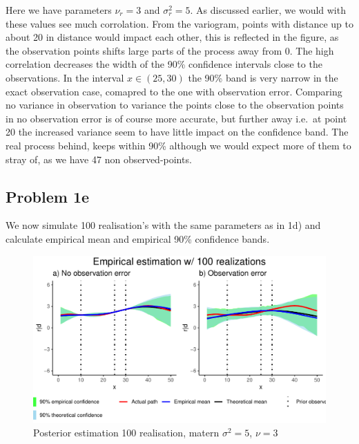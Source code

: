 \documentclass[]{article}
\begin{document}
Here we have parameters \(\nu_r = 3\) and \(\sigma_r^2 = 5\). As
discussed earlier, we would with these values see much corrolation. From
the variogram, points with distance up to about 20 in distance would
impact each other, this is reflected in the figure, as the observation
points shifts large parts of the process away from 0. The high
correlation decreases the width of the 90\% confidence intervals close
to the observations. In the interval \(x\in (25,30)\) the 90\% band is
very narrow in the exact observation case, comapred to the one with
observation error. Comparing no variance in observation to variance the
points close to the observation points in no observation error is of
course more accurate, but further away i.e.~at point 20 the increased
variance seem to have little impact on the confidence band. The real
process behind, keeps within 90\% although we would expect more of them
to stray of, as we have 47 non observed-points.

\subsection{Problem 1e}\label{problem-1e}

We now simulate 100 realisation's with the same parameters as in 1d) and
calculate empirical mean and empirical 90\% confidence bands.

\begin{figure}

{\centering \includegraphics{Exercise_1_files/figure-latex/fig1e1-1} 

}

\caption{\label{fig:fig1e2} Posterior estimation 100 realisation, matern $\sigma^2 = 5$, $\nu = 3$}\label{fig:fig1e1}
\end{figure}
\end{document}
